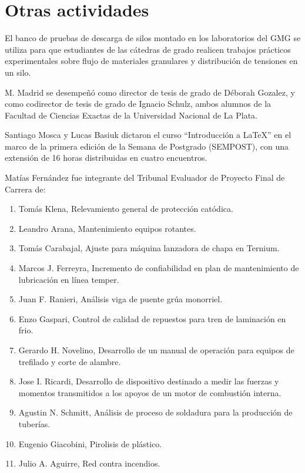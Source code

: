 \documentclass[a4paper,11pt,twoside,final,titlepage,onecolumn,openright]{report}
\begin{document}
\section{Otras actividades}

El banco de pruebas de descarga de silos montado en los laboratorios del GMG se utiliza para que estudiantes de las cátedras de grado realicen trabajos prácticos experimentales sobre flujo de materiales granulares y distribución de tensiones en un silo. 

M. Madrid se desempeñó como director de tesis de grado de Déborah Gozalez, y como codirector de tesis de grado de Ignacio Schulz, ambos alumnos de la Facultad de Ciencias Exactas de la Universidad Nacional de La Plata.

Santiago Mosca y Lucas Basiuk dictaron el curso ``Introducción a \LaTeX'' en el marco de la primera edición de la Semana de Postgrado (SEMPOST), con una extensión de 16 horas distribuidas en cuatro encuentros.

Matías Fernández fue integrante del Tribunal Evaluador de Proyecto Final de Carrera de:
\begin{enumerate}
\item Tomás Klena, Relevamiento general de protección catódica.
\item Leandro Arana, Mantenimiento equipos rotantes.
\item Tomás Carabajal, Ajuste para máquina lanzadora de chapa en Ternium.
\item Marcos J. Ferreyra, Incremento de confiabilidad en plan de mantenimiento de lubricación en línea temper.
\item Juan F. Ranieri, Análisis viga de puente grúa monorriel.
\item Enzo Gaspari, Control de calidad de repuestos para tren de laminación en frio.
\item Gerardo H. Novelino, Desarrollo de un manual de operación para equipos de trefilado y corte de alambre.
\item Jose I. Ricardi, Desarrollo de dispositivo destinado a medir las fuerzas y momentos transmitidos a los apoyos de un motor de combustión interna.
\item Agustin N. Schmitt, Análisis de proceso de soldadura para la producción de tuberías.
\item Eugenio Giacobini, Pirolisis de plástico.
\item Julio A. Aguirre, Red contra incendios.
\end{enumerate}
\end{document}
